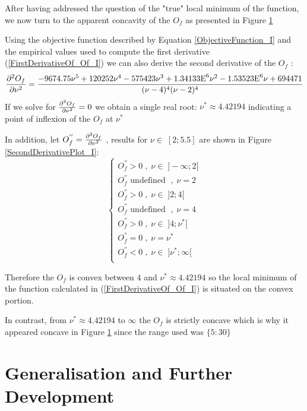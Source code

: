 After having addressed the question of the "true" local minimum of the function, we now turn to the apparent concavity of the $O_f$ as presented in Figure \ref{} \bigskip\par
Using the objective function described by Equation \ref{ObjectiveFunction_I} and the empirical values used to compute the first derivative (\ref{FirstDerivativeOf_Of_I}) we can also derive the second derivative of the $O_f$ :
\begin{equation}\label{SecondDerivativeOf_Of_I}
    \pdv[2]{O_f}{\nu} =  \frac{-9674.75 \nu^5 + 120252 \nu^4 - 575423 \nu^3 + 1.34133\text{E}^6 \nu^2 - 1.53523\text{E}^6 \nu + 694471}{(\nu - 4)^4 (\nu - 2)^4}
\end{equation}
If we solve for $\pdv[2]{O_f}{\nu} = 0$ we obtain a single real root: $\nu^* \approx 4.42194$ indicating a point of inflexion of the $O_f$ at $\nu^*$ 
\smallskip \par
In addition, let $O_f^{''}=\pdv[2]{O_f}{\nu}$ , results for $\nu \in \; [2;5.5]$ are shown in Figure \ref{SecondDerivativePlot_I}:
\begin{equation*}
    \begin{cases}
        O_f^{''} > 0 \; , \; \nu \in \; ]-\infty;2[ \\
        O_f^{''} \text{ undefined } \; , \; \nu = 2 \\
        O_f^{''} > 0 \; , \; \nu \in \; ]2;4[ \\
        O_f^{''} \text{ undefined } \; , \; \nu = 4 \\
        O_f^{''} > 0 \; , \; \nu \in \; ]4;\nu^*[ \\
        O_f^{''} = 0 \; , \; \nu = \nu^* \\
        O_f^{''} < 0 \; , \; \nu \in \; ]\nu^*;\infty[ \\
    \end{cases}
\end{equation*}

Therefore the $O_f$ is convex between $4$ and $\nu^* \approx 4.42194$ so the local minimum of the function calculated in (\ref{FirstDerivativeOf_Of_I}) is situated on the convex portion.
\smallskip\par
In contrast, from $\nu^* \approx 4.42194$ to $\infty$ the $O_f$ is strictly concave which is why it appeared concave in Figure \ref{} since the range used was $\{5:30\}$

\section{Generalisation and Further Development}

